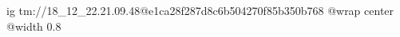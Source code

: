  
 
 
 
 

\qqSecCmtScr


\ifcmt
  ig tm://18_12_22.21.09.48@e1ca28f287d8c6b504270f85b350b768
  @wrap center
  @width 0.8
\fi

